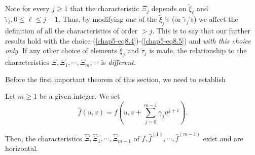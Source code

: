 \begin{remark}\label{chap5-rem8.2}
Note for every $j \geq 1$ that the characteristic $\Xi_{j}$ depends on
$\widetilde{\xi}_{\ell}$ and $\widetilde{\tau}_{\ell}, 0 \leq \ell
\leq j-1$. Thus, by modifying one of the $\widetilde{\xi}_{j}$'s (or
$\widetilde{\tau}_{j}$'s) we affect the definition of all the
characteristics of order $> j$. This is to say that our further
results hold with the choice (\ref{chap5-eq8.4})-(\ref{chap5-eq8.5})
and {\em with this choice only}. If any other choice of elements
$\widetilde{\xi}_{j}$ and $\widetilde{\tau}_{j}$ is made, the
relationship to the characteristics $\Xi, \Xi_{1}, \cdots, \Xi_{m},
\cdots$ is {\em different}.
\end{remark}

Before the first important theorem of this section, we need to
establish
\begin{lemma}\label{chap5-lem8.1}
Let $m \geq 1$ be a given integer. We set
\begin{equation*}
\hat{f}(u, v) = f \left(u, v + \sum\limits_{j=0}^{m-1} \gamma_{j}
u^{j+1} \right).\tag{8.6}\label{chap5-eq8.6} 
\end{equation*}\pageoriginale

Then, the characteristics $\hat{\Xi}, \hat{\Xi}_{1}, \cdots,
\hat{\Xi}_{m-1}$ of $\hat{f}, \hat{f}^{(1)}, \cdots, \hat{f}^{(m-1)}$
exist and are horizontal.
\end{lemma}

